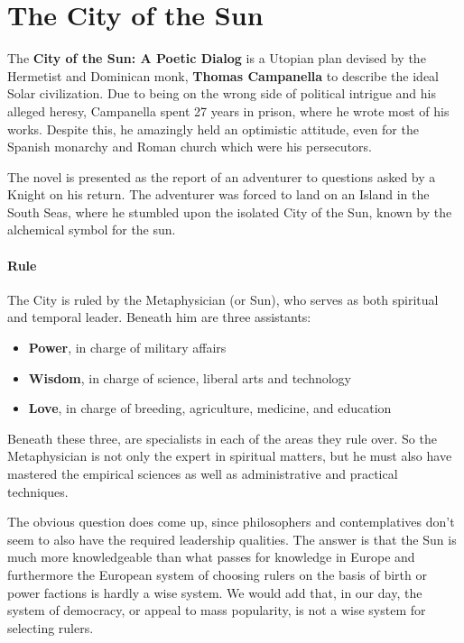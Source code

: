 \section{The City of the Sun}

The \textbf{City of the Sun: A Poetic Dialog} is a Utopian plan devised by the Hermetist and Dominican monk, \textbf{Thomas Campanella} to describe the ideal Solar civilization. Due to being on the wrong side of political intrigue and his alleged heresy, Campanella spent 27 years in prison, where he wrote most of his works. Despite this, he amazingly held an optimistic attitude, even for the Spanish monarchy and Roman church which were his persecutors.

The novel is presented as the report of an adventurer to questions asked by a Knight on his return. The adventurer was forced to land on an Island in the South Seas, where he stumbled upon the isolated City of the Sun, known by the alchemical symbol for the sun.

\paragraph{Rule}


The City is ruled by the Metaphysician (or Sun), who serves as both spiritual and temporal leader. Beneath him are three assistants:

\begin{itemize}


\item \textbf{Power}, in charge of military affairs


\item \textbf{Wisdom}, in charge of science, liberal arts and technology


\item \textbf{Love}, in charge of breeding, agriculture, medicine, and education
\end{itemize}


Beneath these three, are specialists in each of the areas they rule over. So the Metaphysician is not only the expert in spiritual matters, but he must also have mastered the empirical sciences as well as administrative and practical techniques.

The obvious question does come up, since philosophers and contemplatives don't seem to also have the required leadership qualities. The answer is that the Sun is much more knowledgeable than what passes for knowledge in Europe and furthermore the European system of choosing rulers on the basis of birth or power factions is hardly a wise system. We would add that, in our day, the system of democracy, or appeal to mass popularity, is not a wise system for selecting rulers.


